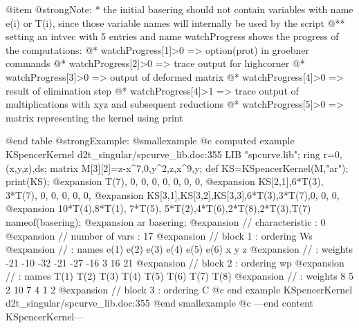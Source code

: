 @item @strong{Note:}
* the initial basering should not contain variables with name
e(i) or T(i), since those variable names will internally be
used by the script
@** setting an intvec with 5 entries and name watchProgress
shows the progress of the computations: @*
watchProgress[1]>0 => option(prot) in groebner commands @*
watchProgress[2]>0 => trace output for highcorner @*
watchProgress[3]>0 => output of deformed matrix @*
watchProgress[4]>0 => result of elimination step @*
watchProgress[4]>1 => trace output of multiplications with xyz
and subsequent reductions @*
watchProgress[5]>0 => matrix representing the kernel using print

@end table
@strong{Example:}
@smallexample
@c computed example KSpencerKernel d2t_singular/spcurve_lib.doc:355 
LIB "spcurve.lib";
ring r=0,(x,y,z),ds;
matrix M[3][2]=z-x^7,0,y^2,z,x^9,y;
def KS=KSpencerKernel(M,"ar");
print(KS);
@expansion{} T(7),   0,      0,      0,     0,     0,     0,     0,  
@expansion{} KS[2,1],6*T(3), 3*T(7), 0,     0,     0,     0,     0,  
@expansion{} KS[3,1],KS[3,2],KS[3,3],6*T(3),3*T(7),0,     0,     0,  
@expansion{} 10*T(4),8*T(1), 7*T(5), 5*T(2),4*T(6),2*T(8),2*T(3),T(7)
nameof(basering);
@expansion{} ar
basering;
@expansion{} //   characteristic : 0
@expansion{} //   number of vars : 17
@expansion{} //        block   1 : ordering Ws
@expansion{} //                  : names    e(1) e(2) e(3) e(4) e(5) e(6) x y z 
@expansion{} //                  : weights  -21 -10 -32 -21 -27 -16 3 16 21 
@expansion{} //        block   2 : ordering wp
@expansion{} //                  : names    T(1) T(2) T(3) T(4) T(5) T(6) T(7) T(8) 
@expansion{} //                  : weights     8    5    2   10    7    4    1    2 
@expansion{} //        block   3 : ordering C
@c end example KSpencerKernel d2t_singular/spcurve_lib.doc:355
@end smallexample
@c ---end content KSpencerKernel---
